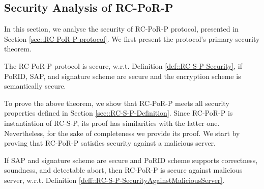
\subsection{Security Analysis of RC-PoR-P}

In this section, we analyse the security of RC-PoR-P protocol, presented in Section \ref{sec::RC-PoR-P-protocol}. We first present the protocol's primary security theorem. 



\begin{theorem}
The RC-PoR-P protocol is secure, w.r.t. Definition \ref{def::RC-S-P-Security}, if PoRID, SAP, and signature scheme are secure and the encryption scheme is semantically secure. 
\end{theorem}



 To prove the above theorem, we show that RC-PoR-P meets all security properties defined in Section \ref{sec::RC-S-P-Definition}.  Since RC-PoR-P is instantiation of RC-S-P, its proof has  similarities with the latter one. Nevertheless, for the sake of completeness we provide its proof. We start by proving that RC-PoR-P satisfies security against a malicious server.   


 \begin{lemma}\label{lemma::RC-PoR-P-SecurityAgainstMaliciousServer}
 If SAP and signature scheme are secure and  PoRID scheme supports correctness, soundness, and detectable abort, then RC-PoR-P is secure against malicious server, w.r.t. Definition \ref{deff::RC-S-P-SecurityAgainstMaliciousServer}. 
 \end{lemma}
 


